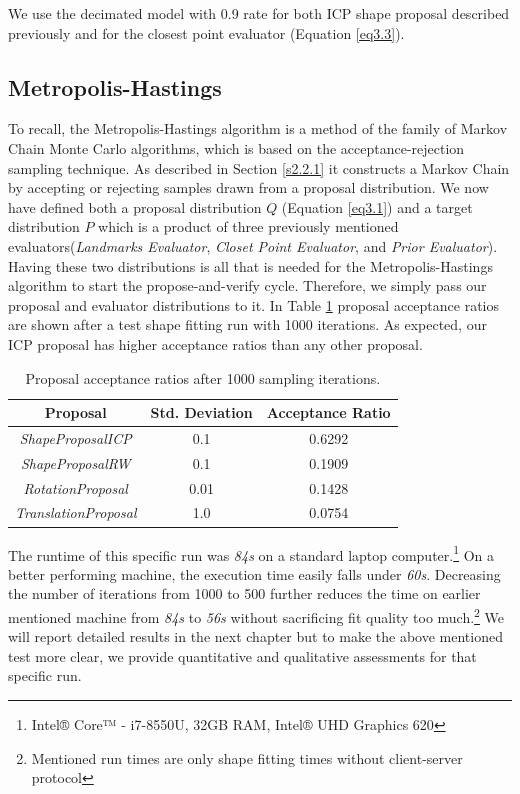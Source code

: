 We use the decimated model with 0.9 rate for both ICP shape proposal described previously and for the closest point evaluator (Equation \ref{eq3.3}). 

\subsection*{Metropolis-Hastings}
To recall, the Metropolis-Hastings algorithm is a method of the family of Markov Chain Monte Carlo algorithms, which is based on the acceptance-rejection sampling technique. As described in Section \ref{s2.2.1} it constructs a Markov Chain by accepting or rejecting samples drawn from a proposal distribution\cite{Schoenborn2017}.  We now have defined both a proposal distribution $Q$ (Equation \ref{eq3.1}) and a target distribution $P$ which is a product of three previously mentioned evaluators(\textit{Landmarks Evaluator}, \textit{Closet Point Evaluator}, and \textit{Prior Evaluator}). Having these two distributions is all that is needed for the Metropolis-Hastings algorithm to start the propose-and-verify cycle. Therefore, we simply pass our proposal and evaluator distributions to it. In Table \ref{t3.3} proposal acceptance ratios are shown after a test shape fitting run with 1000 iterations. As expected, our ICP proposal has higher acceptance ratios than any other proposal.  

\begin{table}[h]
  \centering
  \begin{tabular}{c|c|c}
    Proposal  & Std. Deviation & Acceptance Ratio \\
    \hline
    \textit{ShapeProposalICP}   & 0.1 & 0.6292  \\
    \hline
    \textit{ShapeProposalRW}   & 0.1 & 0.1909 \\
    \hline
    \textit{RotationProposal}   & 0.01 & 0.1428 \\
    \hline
    \textit{TranslationProposal}   & 1.0 & 0.0754 \\
    \hline
  \end{tabular}
  \caption{Proposal acceptance ratios after 1000 sampling iterations.}
  \label{t3.3}
\end{table}

The runtime of this specific run was \textit{84s} on a standard laptop computer.\footnote{Intel® Core™ - i7-8550U, 32GB RAM, Intel® UHD Graphics 620} On a better performing machine, the execution time easily falls under \textit{60s}. Decreasing the number of iterations from 1000 to 500 further reduces the time on earlier mentioned machine from \textit{84s} to \textit{56s} without sacrificing fit quality too much.\footnote{Mentioned run times are only shape fitting times without client-server protocol} We will report detailed results in the next chapter but to make the above mentioned test more clear, we provide quantitative and qualitative assessments for that specific run. 

